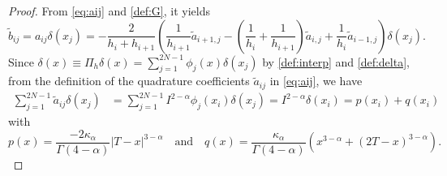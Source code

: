 \documentclass{amsart}
\theoremstyle{definition}
\theoremstyle{remark}
\numberwithin{equation}{section}
\begin{document}
\begin{proof}
  From \eqref{eq:aij} and \eqref{def:G}, it yields
  \begin{equation*}
    \tilde{b}_{ij} = a_{ij} \delta(x_j) = -  \frac{2}{h_i + h_{i+1}} \left( \frac{1}{h_{i+1}} \tilde{a}_{i+1,j} - (\frac{1}{h_{i}}+\frac{1}{h_{i+1}})\tilde{a}_{i,j} + \frac{1}{h_{i}} \tilde{a}_{i-1,j}\right) \delta(x_j).
  \end{equation*}
  Since
  \(
    \delta(x) \equiv \Pi_h \delta(x) = \sum_{j=1}^{2N-1} \phi_j(x) \delta(x_j)
  \) by \eqref{def:interp} and \eqref{def:delta},
  from the definition of the quadrature coefficients $\tilde{a}_{ij}$ in \eqref{eq:aij}, we have
  \begin{equation*}
    \begin{aligned}
      \sum_{j=1}^{2N-1} \tilde{a}_{ij} \delta(x_j)
                  & = \sum_{j=1}^{2N-1} I^{2-\alpha} \phi_j(x_i) \delta(x_j) 
                    = I^{2-\alpha} \delta(x_i)
                  =  p(x_i) + q(x_i)
    \end{aligned}
  \end{equation*}
  with
  \begin{equation*}
      p(x) = \frac{-2 \kappa_\alpha}{\Gamma(4-\alpha)}|T-x|^{3-\alpha} \quad \text{and} \quad
      q(x) = \frac{\kappa_\alpha}{\Gamma(4-\alpha)}\left( x^{3-\alpha} + (2T-x)^{3-\alpha} \right).
  \end{equation*}


\end{proof}
\end{document}
